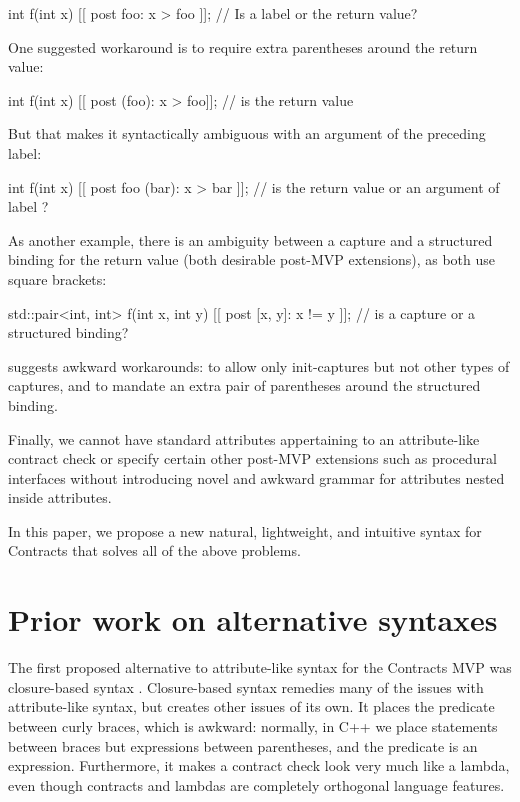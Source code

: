 \begin{codeblock}
int f(int x)
  [[ post foo: x > foo ]];   // Is  a label or the return value?
\end{codeblock}

One suggested workaround is to require extra parentheses around the return value:

\begin{codeblock}
int f(int x)
  [[ post (foo): x > foo]];   //  is the return value
\end{codeblock}


But that makes it syntactically ambiguous with an argument of the preceding label:
\begin{codeblock}
int f(int x)
  [[ post foo (bar): x > bar ]];   // is  the return value or an argument of label ?
\end{codeblock}

 As another example, there is an ambiguity between a capture and a structured binding for the return value (both desirable post-MVP extensions), as both use square brackets:
 
\begin{codeblock}
std::pair<int, int> f(int x, int y)
  [[ post [x, y]: x != y ]];   // is \tcode{[x, y]} a capture or a structured binding?
\end{codeblock}
 
\cite{P2935R3} suggests awkward workarounds:  to allow only init-captures but not other types of captures, and to mandate an extra pair of parentheses around the structured binding. 

Finally, we cannot have standard attributes appertaining to an attribute-like contract check or specify certain other post-MVP extensions such as procedural interfaces without introducing novel and awkward grammar for attributes nested inside attributes.

In this paper, we propose a new natural, lightweight, and intuitive syntax for Contracts that solves all of the above problems.
 

\section{Prior work on alternative syntaxes}

The first proposed alternative to attribute-like syntax for the Contracts MVP was closure-based syntax \cite{P2461R1}. Closure-based syntax remedies many of the issues with attribute-like syntax, but creates other issues of its own. It places the predicate between curly braces, which is awkward: normally, in C++ we place statements between braces but expressions between parentheses, and the predicate is an expression. Furthermore, it makes a contract check look very much like a lambda, even though contracts and lambdas are completely orthogonal language features.

